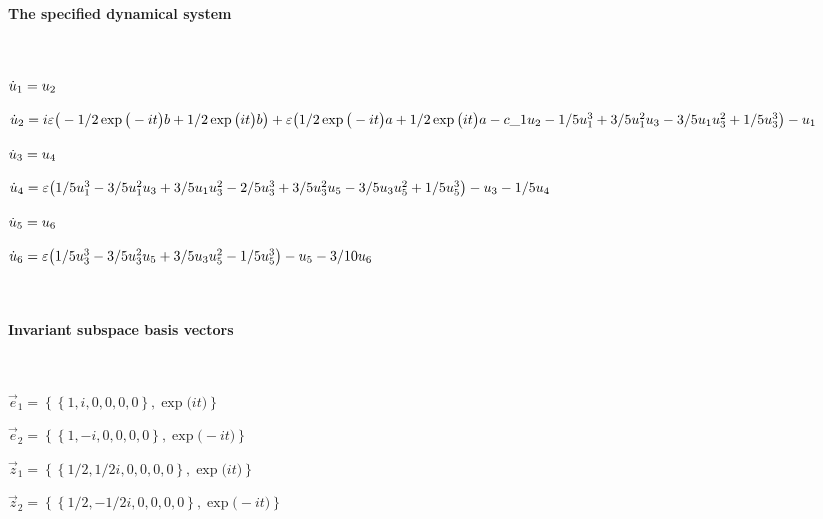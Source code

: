 
\(\)
\paragraph{The specified dynamical system}
\(
\)\par

\(\dot u_{1}=u\sb2
\)\par

\(\dot u_{2}=i \varepsilon \big(-1/2 \exp \big(-i t\big) b+1/2 \exp \big(i t\big)
 b\big)+\varepsilon \big(1/2 \exp \big(-i t\big) a+1/2 \exp \big(i t\big) a-
c\_1 u\sb2-1/5 u\sb1^{3}+3/5 u\sb1^{2} u\sb3-3/5 u\sb1 u\sb3^{2}+1/5 
u\sb3^{3}\big)-u\sb1
\)\par

\(\dot u_{3}=u\sb4
\)\par

\(\dot u_{4}=\varepsilon \big(1/5 u\sb1^{3}-3/5 u\sb1^{2} u\sb3+3/5 u\sb1 u\sb3^{
2}-2/5 u\sb3^{3}+3/5 u\sb3^{2} u\sb5-3/5 u\sb3 u\sb5^{2}+1/5 u\sb5^{3}
\big)-u\sb3-1/5 u\sb4
\)\par

\(\dot u_{5}=u\sb6
\)\par

\(\dot u_{6}=\varepsilon \big(1/5 u\sb3^{3}-3/5 u\sb3^{2} u\sb5+3/5 u\sb3 u\sb5^{
2}-1/5 u\sb5^{3}\big)-u\sb5-3/10 u\sb6
\)\par

\(\)
\paragraph{Invariant subspace basis vectors}
\(
\)\par

\(\vec e_{1}=\left\{
\left\{
1 , i , 0 , 0 , 0 , 0
\right\} , \exp \big(i t\big)
\right\}
\)\par

\(\vec e_{2}=\left\{
\left\{
1 , -i , 0 , 0 , 0 , 0
\right\} , \exp \big(-i t\big)
\right\}
\)\par

\(\vec z_{1}=\left\{
\left\{
1/2 , 1/2 i , 0 , 0 , 0 , 0
\right\} , \exp \big(i t\big)
\right\}
\)\par

\(\vec z_{2}=\left\{
\left\{
1/2 , -1/2 i , 0 , 0 , 0 , 0
\right\} , \exp \big(-i t\big)
\right\}
\)\par
